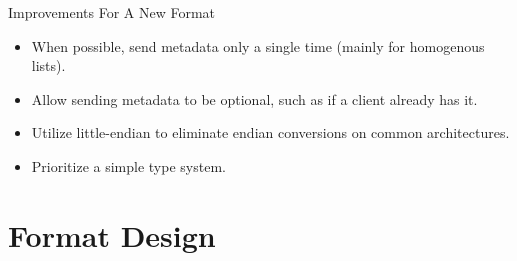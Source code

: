 \documentclass{beamer}
\begin{document}
\begin{frame}{Improvements For A New Format}
	\begin{itemize}
		\item When possible, send metadata only a single time (mainly for homogenous lists).
		\item Allow sending metadata to be optional, such as if a client already has it.
		\item Utilize little-endian to eliminate endian conversions on common architectures.
		\item Prioritize a simple type system.
	\end{itemize}
\end{frame}

\section{Format Design}
\end{document}
